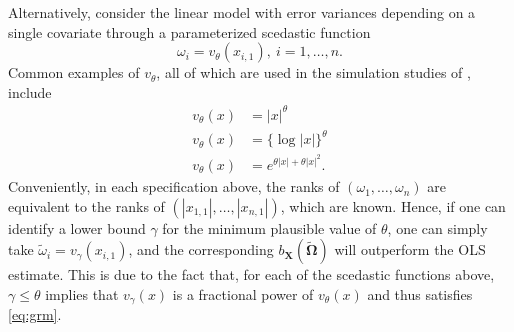 \documentclass[12pt]{article}
\newcommand{\bl}[1]{{\mathbf #1}}
\newcommand{\bs}[1]{\boldsymbol #1}
\begin{document}
Alternatively, consider the linear model with error variances depending on a single covariate through a parameterized scedastic function
\begin{equation*}
    \omega_i = v_{\theta}(x_{i,1}),~i=1, \dots, n.
\end{equation*}
Common examples of $v_{\theta}$, all of which are used in the simulation studies of \cite{romano_resurrecting_2017}, include
\begin{equation}\label{eq:scedasticfns}
\begin{aligned}
    v_{{\theta}}(x) &= |x|^{\theta} \\
    v_{{\theta}}(x) &= \{\log|x|\}^{\theta} \\
    v_{{\theta}}(x) &= e^{\theta|x| + \theta|x|^2}.
\end{aligned}
\end{equation}
Conveniently, in each specification above, the ranks of $(\omega_1, \dots, \omega_n)$ are equivalent to the ranks of $(|x_{1,1}|, \dots, |x_{n,1}|)$, which are known. Hence, if one can identify a lower bound $\gamma$ for the minimum plausible value of $\theta$, one can simply take $\tilde{\omega}_i = v_{\gamma}(x_{i,1})$, and the corresponding $b_{\bl{X}}(\tilde{\bs{\Omega}})$ will outperform the OLS estimate. This is due to the fact that, for each of the scedastic functions above, $\gamma \leq \theta$ implies that $v_{\gamma}(x)$ is a fractional power of $v_{\theta}(x)$ and thus satisfies \eqref{eq:grm}.
\end{document}
